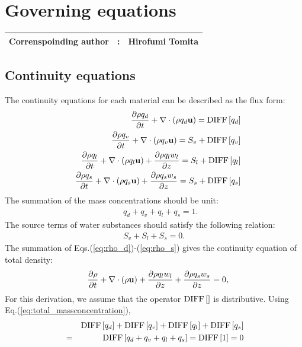 \chapter{Governing equations}
{\bf \Large
\begin{tabular}{ccc}
\hline
  Correnspoinding author & : & Hirofumi Tomita\\
\hline
\end{tabular}
}

\section{Continuity equations}

The continuity equations for each material can be described as the flux form:
\begin{eqnarray}
&&  \frac{\partial \rho q_d}{\partial t}
+ \nabla \cdot\left(\rho q_d{\bf u}\right)  = {\rm DIFF}\left[q_d\right]
\label{eq:rho_d}\\
&&  \frac{\partial \rho q_v}{\partial t}
+ \nabla \cdot\left(\rho q_v {\bf u}\right)  = S_v + {\rm DIFF}\left[q_v\right]
\label{eq:rho_v}\\
&&  \frac{\partial \rho q_l}{\partial t}
+ \nabla \cdot\left(\rho q_l {\bf u}\right)
+ \frac{\partial \rho q_l w_l}{\partial z}=S_l + {\rm DIFF}\left[q_l\right]
\label{eq:rho_l}\\
&&  \frac{\partial \rho q_s}{\partial t}
+ \nabla \cdot\left(\rho q_s {\bf u}\right)
+ \frac{\partial \rho q_s w_s}{\partial z}=S_s + {\rm DIFF}\left[q_s\right]
\label{eq:rho_s}
\end{eqnarray}
The summation of the mass concentrations should be unit:
\begin{eqnarray}
&& q_d + q_v + q_l + q_s = 1. \label{eq:total_massconcentration}
\end{eqnarray}
The source terms of water substances should satisfy the following relation:
\begin{eqnarray}
  S_v + S_l + S_s = 0.
\end{eqnarray}
The summation of Eqs.(\ref{eq:rho_d})-(\ref{eq:rho_s}) gives the
continuity equation of total density:
\begin{eqnarray}
&&  \frac{\partial \rho}{\partial t}
+ \nabla\cdot\left(\rho{\bf u}\right)
+ \frac{\partial \rho q_l w_l}{\partial z}
+ \frac{\partial \rho q_s w_s}{\partial z}
=0, \label{eq:rhotot}
\end{eqnarray}
For this derivation,
we assume that
the operator ${ \rm DIFF}\left[\right]$ is distributive.
Using Eq.(\ref{eq:total_massconcentration}),
\begin{eqnarray}
&&  { \rm DIFF}\left[q_d\right]
+{ \rm DIFF}\left[q_v\right]
+{ \rm DIFF}\left[q_l\right]
+{ \rm DIFF}\left[q_s\right]\nonumber\\
&=&{ \rm DIFF}\left[q_d+q_v+q_l+q_s\right]
={ \rm DIFF}\left[1\right] = 0
\end{eqnarray}

